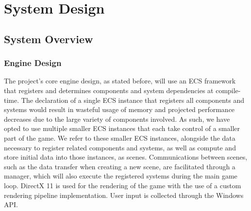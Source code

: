\section{System Design}
\label{sec:system-design}

\subsection{System Overview}
\label{subsec:system-overview}

\subsubsection*{Engine Design}

The project's core engine design, as stated before, will use an ECS framework that registers and
determines components and system dependencies at compile-time.
The declaration of a single ECS instance that registers all components and systems would result in
wasteful usage of memory and projected performance decreases due to the large variety of components involved.
As such, we have opted to use multiple smaller ECS instances that each take control of a smaller part of the game.
We refer to these smaller ECS instances, alongside the data necessary to register related components and systems,
as well as compute and store initial data into those instances, as scenes.
Communications between scenes, such as the data transfer when creating a new scene, are facilitated through
a manager, which will also execute the registered systems during the main game loop.
DirectX 11 is used for the rendering of the game with the use of a custom rendering pipeline implementation.
User input is collected through the Windows API\@.

